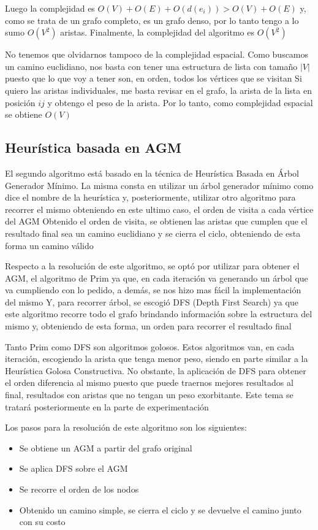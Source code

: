 \documentclass[10pt,a4paper]{article}
\begin{document}
Luego la complejidad es $O(V) + O(E) + O(d(e_i)) > O(V) + O(E)$ y, como se trata de un grafo completo, es un grafo denso, por lo tanto tengo a lo sumo $O(V^2)$ aristas. Finalmente, la complejidad del algoritmo es $O(V^2)$

No tenemos que olvidarnos tampoco de la complejidad espacial. Como buscamos un camino euclidiano, nos basta con tener una estructura de lista con tamaño $|V|$ puesto que lo que voy a tener son, en orden, todos los vértices que se visitan
Si quiero las aristas individuales, me basta revisar en el grafo, la arista de la lista en posición $ij$ y obtengo el peso de la arista. Por lo tanto, como complejidad espacial se obtiene $O(V)$

\subsection{Heurística basada en AGM}

El segundo algoritmo está basado en la técnica de Heurística Basada en Árbol Generador Mínimo. La misma consta en utilizar un árbol generador mínimo como dice el nombre de la heurística y, posteriormente, utilizar otro algoritmo para recorrer el mismo obteniendo en este ultimo caso, el orden de visita a cada vértice del AGM
Obtenido el orden de visita, se obtienen las aristas que cumplen que el resultado final sea un camino euclidiano y se cierra el ciclo, obteniendo de esta forma un camino válido

Respecto a la resolución de este algoritmo, se optó por utilizar para obtener el AGM, el algoritmo de Prim ya que, en cada iteración va generando un árbol que va cumpliendo con lo pedido, a demás, se nos hizo mas fácil la implementación del mismo
Y, para recorrer árbol, se escogió DFS (Depth First Search) ya que este algoritmo recorre todo el grafo brindando información sobre la estructura del mismo y, obteniendo de esta forma, un orden para recorrer el resultado final

Tanto Prim como DFS son algoritmos golosos. Estos algoritmos van, en cada iteración, escogiendo la arista que tenga menor peso, siendo en parte similar a la Heurística Golosa Constructiva. No obstante, la aplicación de DFS para obtener el orden diferencia al mismo puesto que puede traernos mejores resultados al final, resultados con aristas que no tengan un peso exorbitante. Este tema se tratará posteriormente en la parte de experimentación
 
 Los pasos para la resolución de este algoritmo son los siguientes:
 \begin{itemize}
     \item Se obtiene un AGM a partir del grafo original
     \item Se aplica DFS sobre el AGM
     \item Se recorre el orden de los nodos
     \item Obtenido un camino simple, se cierra el ciclo y se devuelve el camino junto con su costo
 \end{itemize}
\end{document}

